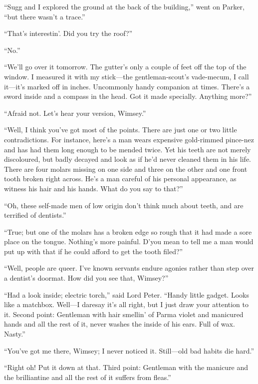 \enquote{Sugg and I explored the ground at the back of the building,} went on Parker, \enquote{but there wasn’t a trace.}

\enquote{That’s interestin’. Did you try the roof?}

\enquote{No.}

\enquote{We’ll go over it tomorrow. The gutter’s only a couple of feet off the top of the window. I measured it with my stick\allowbreak---\allowbreak the gentleman-scout’s vade-mecum, I call it\allowbreak---\allowbreak it’s marked off in inches. Uncommonly handy companion at times. There’s a sword inside and a compass in the head. Got it made specially. Anything more?}

\enquote{Afraid not. Let’s hear your version, Wimsey.}

\enquote{Well, I think you’ve got most of the points. There are just one or two little contradictions. For instance, here’s a man wears expensive gold-rimmed pince-nez and has had them long enough to be mended twice. Yet his teeth are not merely discoloured, but badly decayed and look as if he’d never cleaned them in his life. There are four molars missing on one side and three on the other and one front tooth broken right across. He’s a man careful of his personal appearance, as witness his hair and his hands. What do you say to that?}

\enquote{Oh, these self-made men of low origin don’t think much about teeth, and are terrified of dentists.}

\enquote{True; but one of the molars has a broken edge so rough that it had made a sore place on the tongue. Nothing’s more painful. D’you mean to tell me a man would put up with that if he could afford to get the tooth filed?}

\enquote{Well, people are queer. I’ve known servants endure agonies rather than step over a dentist’s doormat. How did you see that, Wimsey?}

\enquote{Had a look inside; electric torch,} said Lord Peter. \enquote{Handy little gadget. Looks like a matchbox. Well\allowbreak---\allowbreak I daresay it’s all right, but I just draw your attention to it. Second point: Gentleman with hair smellin’ of Parma violet and manicured hands and all the rest of it, never washes the inside of his ears. Full of wax. Nasty.}

\enquote{You’ve got me there, Wimsey; I never noticed it. Still\allowbreak---\allowbreak old bad habits die hard.}

\enquote{Right oh! Put it down at that. Third point: Gentleman with the manicure and the brilliantine and all the rest of it suffers from fleas.}

